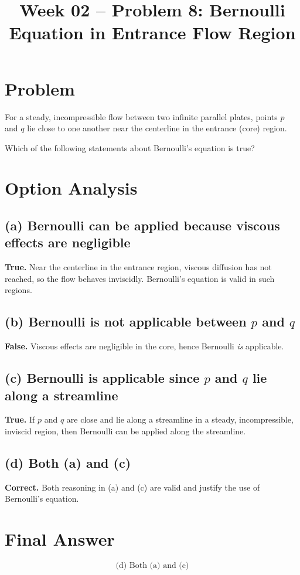 \documentclass[12pt]{article}
\title{Week 02 -- Problem 8: Bernoulli Equation in Entrance Flow Region}
\date{}
\begin{document}
\maketitle

\section*{Problem}

For a steady, incompressible flow between two infinite parallel plates, points \( p \) and \( q \) lie close to one another near the centerline in the entrance (core) region.

Which of the following statements about Bernoulli’s equation is true?

\section*{Option Analysis}

\subsection*{(a) Bernoulli can be applied because viscous effects are negligible}

\textbf{True.} Near the centerline in the entrance region, viscous diffusion has not reached, so the flow behaves inviscidly. Bernoulli’s equation is valid in such regions.

\subsection*{(b) Bernoulli is not applicable between \( p \) and \( q \)}

\textbf{False.} Viscous effects are negligible in the core, hence Bernoulli \emph{is} applicable.

\subsection*{(c) Bernoulli is applicable since \( p \) and \( q \) lie along a streamline}

\textbf{True.} If \( p \) and \( q \) are close and lie along a streamline in a steady, incompressible, inviscid region, then Bernoulli can be applied along the streamline.

\subsection*{(d) Both (a) and (c)}

\textbf{Correct.} Both reasoning in (a) and (c) are valid and justify the use of Bernoulli’s equation.

\section*{Final Answer}

\[
\boxed{\text{(d) Both (a) and (c)}}
\]
\end{document}
